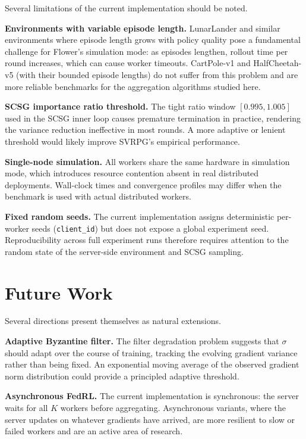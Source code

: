 Several limitations of the current implementation should be noted.

\textbf{Environments with variable episode length.} LunarLander and similar
environments where episode length grows with policy quality pose a fundamental
challenge for Flower's simulation mode: as episodes lengthen, rollout time per
round increases, which can cause worker timeouts. CartPole-v1 and HalfCheetah-v5
(with their bounded episode lengths) do not suffer from this problem and are
more reliable benchmarks for the aggregation algorithms studied here.

\textbf{SCSG importance ratio threshold.} The tight ratio window $[0.995, 1.005]$
used in the SCSG inner loop causes premature termination in practice, rendering
the variance reduction ineffective in most rounds. A more adaptive or lenient
threshold would likely improve SVRPG's empirical performance.

\textbf{Single-node simulation.} All workers share the same hardware in
simulation mode, which introduces resource contention absent in real distributed
deployments. Wall-clock times and convergence profiles may differ when the
benchmark is used with actual distributed workers.

\textbf{Fixed random seeds.} The current implementation assigns deterministic
per-worker seeds (\texttt{client\_id}) but does not expose a global experiment
seed. Reproducibility across full experiment runs therefore requires attention
to the random state of the server-side environment and SCSG sampling.

\section*{Future Work}

Several directions present themselves as natural extensions.

\textbf{Adaptive Byzantine filter.} The filter degradation problem suggests that
$\sigma$ should adapt over the course of training, tracking the evolving gradient
variance rather than being fixed. An exponential moving average of the observed
gradient norm distribution could provide a principled adaptive threshold.

\textbf{Asynchronous FedRL.} The current implementation is synchronous: the
server waits for all $K$ workers before aggregating. Asynchronous variants, where
the server updates on whatever gradients have arrived, are more resilient to
slow or failed workers and are an active area of research.

